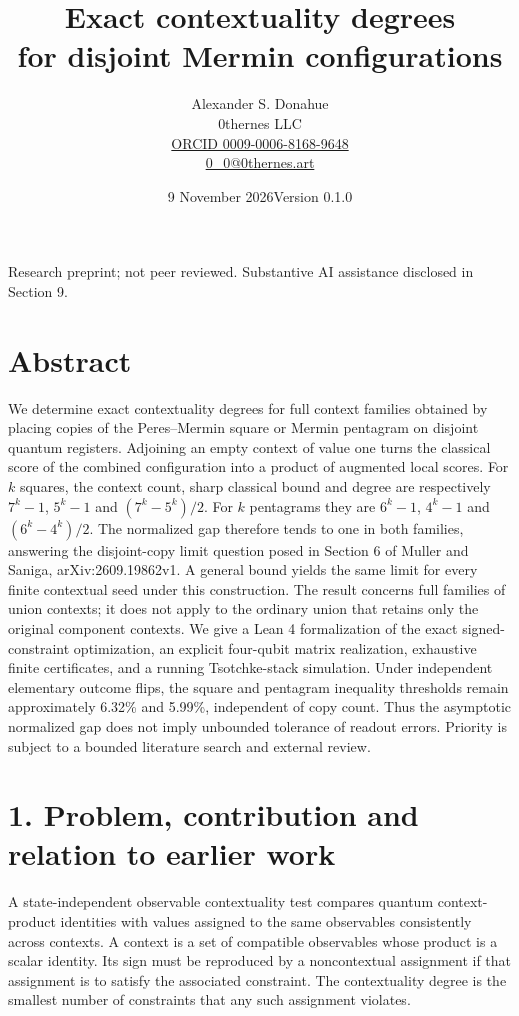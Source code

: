 \documentclass[10pt,a4paper]{article}
\title{\vspace{-12mm}\sffamily\bfseries Exact contextuality degrees\\for disjoint Mermin configurations}
\author{Alexander S. Donahue\\\small 0thernes LLC\\\small\href{https://orcid.org/0009-0006-8168-9648}{ORCID 0009-0006-8168-9648}\\\small\href{mailto:0_0@0thernes.art}{0\_0@0thernes.art}}
\date{9 November 2026\quad\textbullet\quad Version 0.1.0}
\begin{document}
\maketitle
\begin{center}\small Research preprint; not peer reviewed. Substantive AI assistance disclosed in Section 9.\end{center}
\section{Abstract}\label{abstract}

We determine exact contextuality degrees for full context families obtained by placing copies of the Peres--Mermin square or Mermin pentagram on disjoint quantum registers. Adjoining an empty context of value one turns the classical score of the combined configuration into a product of augmented local scores. For \(k\) squares, the context count, sharp classical bound and degree are respectively \(7^k-1\), \(5^k-1\) and \((7^k-5^k)/2\). For \(k\) pentagrams they are \(6^k-1\), \(4^k-1\) and \((6^k-4^k)/2\). The normalized gap therefore tends to one in both families, answering the disjoint-copy limit question posed in Section 6 of Muller and Saniga, arXiv:2609.19862v1. A general bound yields the same limit for every finite contextual seed under this construction. The result concerns full families of union contexts; it does not apply to the ordinary union that retains only the original component contexts. We give a Lean 4 formalization of the exact signed-constraint optimization, an explicit four-qubit matrix realization, exhaustive finite certificates, and a running Tsotchke-stack simulation. Under independent elementary outcome flips, the square and pentagram inequality thresholds remain approximately 6.32\% and 5.99\%, independent of copy count. Thus the asymptotic normalized gap does not imply unbounded tolerance of readout errors. Priority is subject to a bounded literature search and external review.

\section{1. Problem, contribution and relation to earlier work}\label{problem-contribution-and-relation-to-earlier-work}

A state-independent observable contextuality test compares quantum context-product identities with values assigned to the same observables consistently across contexts. A context is a set of compatible observables whose product is a scalar identity. Its sign must be reproduced by a noncontextual assignment if that assignment is to satisfy the associated constraint. The contextuality degree is the smallest number of constraints that any such assignment violates.
\end{document}

